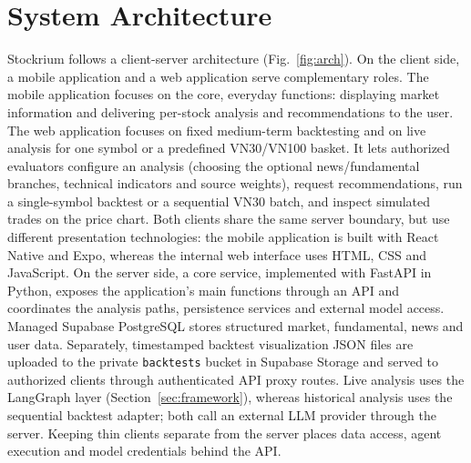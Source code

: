 \documentclass[runningheads]{llncs}
\begin{document}
\section{System Architecture}
\label{sec:architecture}
Stockrium follows a client-server architecture (Fig.~\ref{fig:arch}). On the
client side, a mobile application and a web application serve complementary roles.
The mobile application focuses on the core, everyday functions: displaying market
information and delivering per-stock analysis and recommendations to the user. The
web application focuses on fixed medium-term backtesting and on live analysis for
one symbol or a predefined VN30/VN100 basket. It lets authorized evaluators configure
an analysis (choosing the optional news/fundamental branches, technical indicators
and source weights), request recommendations, run a single-symbol backtest or a
sequential VN30 batch, and inspect simulated trades on the price chart. Both clients
share the same server boundary, but use different presentation technologies: the
mobile application is built with React Native and Expo, whereas the internal web
interface uses HTML, CSS and JavaScript. On the server side, a core service,
implemented with FastAPI in Python,
exposes the application's main functions through an API and coordinates the
analysis paths, persistence services and external model access. Managed Supabase
PostgreSQL stores structured market, fundamental, news and user data. Separately,
timestamped backtest visualization JSON files are uploaded to the private
\texttt{backtests} bucket in Supabase Storage and served to authorized clients
through authenticated API proxy routes. Live analysis uses the LangGraph layer
(Section~\ref{sec:framework}), whereas historical analysis uses the sequential
backtest adapter; both call an external LLM provider through the server. Keeping
thin clients separate from the server places data access, agent execution and model
credentials behind the API.
\end{document}
